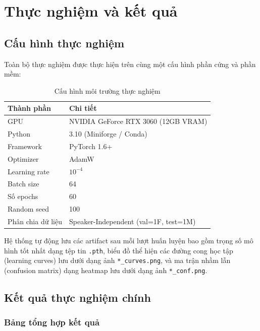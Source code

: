 \chapter{Thực nghiệm và kết quả}
\label{chap:experiments}

\section{Cấu hình thực nghiệm}
\label{sec:experiment_setup}

Toàn bộ thực nghiệm được thực hiện trên cùng một cấu hình phần cứng và phần mềm:

\begin{table}[H]
\centering
\caption{Cấu hình môi trường thực nghiệm}
\label{tab:env_config}
\begin{tabular}{ll}
\toprule
\textbf{Thành phần} & \textbf{Chi tiết} \\
\midrule
GPU & NVIDIA GeForce RTX 3060 (12GB VRAM) \\
Python & 3.10 (Miniforge / Conda) \\
Framework & PyTorch 1.6+ \\
Optimizer & AdamW \\
Learning rate & $10^{-4}$ \\
Batch size & 64 \\
Số epochs & 60 \\
Random seed & 100 \\
Phân chia dữ liệu & Speaker-Independent (val=1F, test=1M) \\
\bottomrule
\end{tabular}
\end{table}

Hệ thống tự động lưu các artifact sau mỗi lượt huấn luyện bao gồm trọng số mô hình tốt nhất dạng tệp tin \texttt{.pth}, biểu đồ thể hiện các đường cong học tập (learning curves) lưu dưới dạng ảnh \texttt{*\_curves.png}, và ma trận nhầm lẫn (confusion matrix) dạng heatmap lưu dưới dạng ảnh \texttt{*\_conf.png}.


\section{Kết quả thực nghiệm chính}
\label{sec:main_results}

\subsection{Bảng tổng hợp kết quả}

